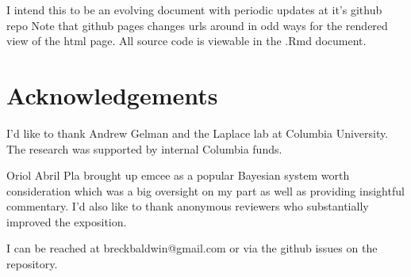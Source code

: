 \documentclass[AMA,STIX1COL]{WileyNJD-v2}
\begin{document}
I intend this to be an evolving document with periodic updates at it's github repo  Note that github pages changes urls around in odd ways for the rendered view of the html page. All source code is viewable in the .Rmd document.

\section{Acknowledgements}

I'd like to thank Andrew Gelman and the Laplace lab at Columbia University. The research was supported by internal Columbia funds. 

Oriol Abril Pla brought up emcee as a popular Bayesian system worth consideration which was a big oversight on my part as well as providing insightful commentary. I'd also like to thank anonymous reviewers who substantially improved the exposition. 

I can be reached at breckbaldwin@gmail.com or via the github issues on the repository. 

\nocite{*}%
%
\end{document}
